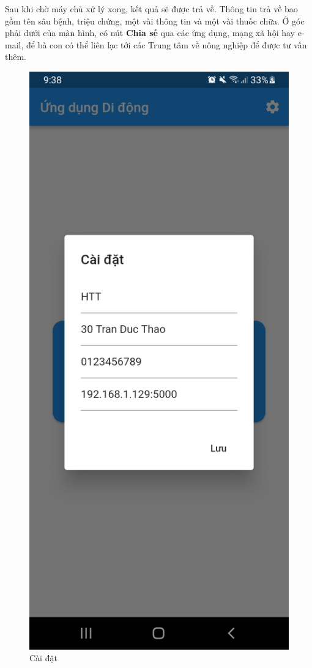 \documentclass[a4paper,14pt]{extarticle}
\begin{document}
	Sau khi chờ máy chủ xử lý xong, kết quả sẽ được trả về. Thông tin trả về bao gồm tên sâu bệnh, triệu chứng, một vài thông tin và một vài thuốc chữa. Ở góc phải dưới của màn hình, có nút \textbf{Chia sẻ} qua các ứng dụng, mạng xã hội hay e-mail, để bà con có thể liên lạc tới các Trung tâm về nông nghiệp để được tư vấn thêm.

	\begin{figure}[H]
		\centering
		\includegraphics[scale=0.1]{images/screenshot2.jpg}
		\caption{Cài đặt}
	\end{figure}
\end{document}
